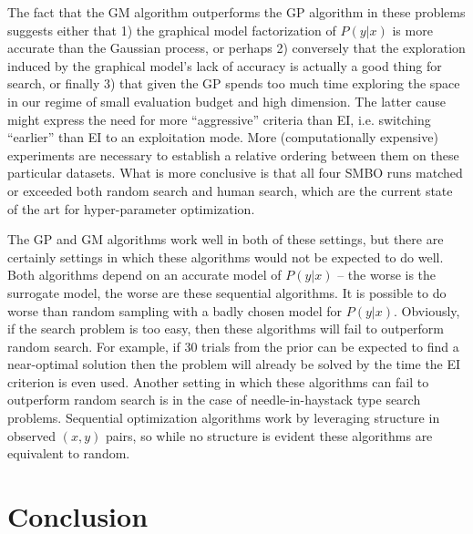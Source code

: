 \documentclass{article}
\newcommand{\vs}[1]{\vspace*{-#1mm}}
\newcommand{\Bs}{\vs{2}}
\newcommand{\as}{\vs{1}}
\begin{document}

The fact that the GM algorithm outperforms the GP algorithm in these problems suggests either
that 1) the graphical model factorization of $P(y|x)$ is more accurate than the Gaussian process,
or perhaps 2) conversely that the exploration induced by the graphical
model's lack of accuracy is actually a good thing for search, or
finally 3) that given the GP spends too much time exploring the space
in our regime of small evaluation budget and high dimension. The
latter cause might express the need for more ``aggressive'' criteria
than EI, i.e. switching ``earlier'' than EI to an exploitation mode.  
More (computationally expensive) experiments are necessary to establish a relative ordering between them
on these particular datasets.
What is more conclusive is that all four SMBO runs matched or exceeded both random search and human search,
which are the current state of the art for hyper-parameter optimization.

The GP and GM algorithms work well in both of these settings,
but there are certainly settings in which these algorithms would not be expected to do well.
Both algorithms depend on an accurate model of $P(y|x)$ -- the worse is the surrogate model,
the worse are these sequential algorithms.  It is possible to do worse than random sampling
with a badly chosen model for $P(y|x)$. Obviously, if the search problem is too easy, then these algorithms will fail to outperform random search.
For example, if 30 trials from the prior can be expected to find a near-optimal solution then the problem will already be solved by the time the EI criterion is even used.
Another setting in which these algorithms can fail to outperform random search
is in the case of needle-in-haystack type search problems. Sequential optimization algorithms work by leveraging structure in observed $(x,y)$ pairs,
so while no structure is evident these algorithms are equivalent to random.

\Bs
\section{Conclusion}
\label{sec:conclusion}
\as
\end{document}
